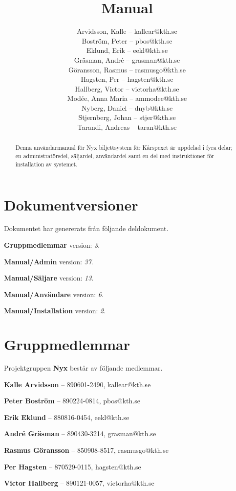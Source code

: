 \documentclass[a4paper, twoside, 11pt, titlepage]{article}
\author{
	\small
	Arvidsson, Kalle -- kallear@kth.se\\
	Boström, Peter -- pbos@kth.se\\
	Eklund, Erik -- eekl@kth.se\\
	Gräsman, André -- grasman@kth.se\\
	Göransson, Rasmus -- rasmusgo@kth.se\\
	Hagsten, Per -- hagsten@kth.se\\
	Hallberg, Victor -- victorha@kth.se\\
	Modée, Anna Maria -- ammodee@kth.se\\
	Nyberg, Daniel -- dnyb@kth.se\\
	Stjernberg, Johan -- stjer@kth.se\\
	Tarandi, Andreas -- taran@kth.se
	}
\title{Manual}
\begin{document}
\maketitle

\clearpage
\thispagestyle{empty}
\mbox{}
\newpage

\begin{abstract}
	Denna användarmanual för Nyx biljettsystem för Kårspexet är uppdelad i fyra delar; en administratörsdel, säljardel, användardel samt en del med instruktioner för installation av systemet.
\end{abstract}

\newpage

\setcounter{page}{1}

\startfooter

\clearpage
\section*{Dokumentversioner}


Dokumentet har genererats från följande deldokument.

\textbf{Gruppmedlemmar} version: \emph{3}.

\textbf{Manual/Admin} version: \emph{37}.

\textbf{Manual/Säljare} version: \emph{13}.

\textbf{Manual/Användare} version: \emph{6}.

\textbf{Manual/Installation} version: \emph{2}.

\clearpage
\section*{Gruppmedlemmar}


Projektgruppen \textbf{Nyx} består av följande medlemmar.

\textbf{Kalle Arvidsson} -- 890601-2490, kallear@kth.se

\textbf{Peter Boström} -- 890224-0814, pbos@kth.se

\textbf{Erik Eklund} -- 880816-0454, eekl@kth.se

\textbf{André Gräsman} -- 890430-3214, grasman@kth.se

\textbf{Rasmus Göransson} -- 850908-8517, rasmusgo@kth.se

\textbf{Per Hagsten} -- 870529-0115, hagsten@kth.se

\textbf{Victor Hallberg} -- 890121-0057, victorha@kth.se
\end{document}
